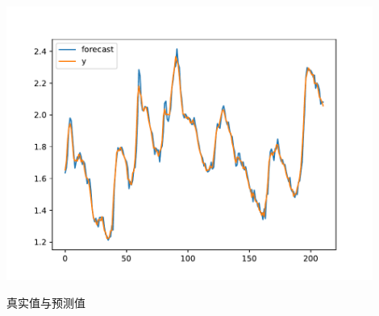\documentclass[cn]{homework}
\begin{document}
\begin{subproblem}[(\alph*)]
        \begin{marginfigure}
            \includegraphics[width=0.9\textwidth]{real-prediction}
            \caption{真实值与预测值}
            \label{fig:residual}
        \end{marginfigure}
        

\end{subproblem}
\end{document}
